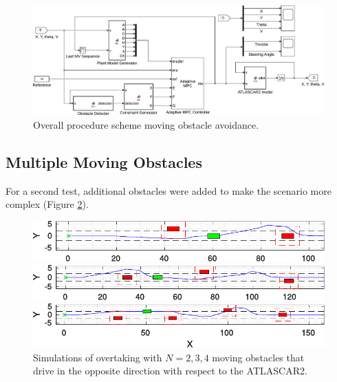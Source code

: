 \begin{figure}[!h]
	\centering
	\includegraphics[width=\textwidth]{../figure/MovingObstacleAvoidance.pdf}
	\caption{Overall procedure scheme moving obstacle avoidance.}
	\label{fig:MovingObstacleAvoidance}
\end{figure}
%
\subsection{Multiple Moving Obstacles}
For a second test, additional obstacles were added to make the scenario more complex (Figure \ref{fig:obstacleAvoidance_random}).
\begin{figure}[!h]
	\centering
	\begin{minipage}[t]{\textwidth}
		\includegraphics[width=\textwidth]{./figure/random_N_obstacles/overtaking_random_2.pdf}
	\end{minipage}
	\begin{minipage}[t]{\textwidth}
		\includegraphics[width=\textwidth]{./figure/random_N_obstacles/overtaking_random.pdf}
	\end{minipage}
	\begin{minipage}[t]{\textwidth}
		\includegraphics[width=\textwidth]{./figure/random_N_obstacles/overtaking_random_1.pdf}
	\end{minipage}
	\caption{Simulations of overtaking with $N = 2,3,4$ moving obstacles that drive in the opposite direction with respect to the ATLASCAR2.}
	\label{fig:obstacleAvoidance_random}
\end{figure}

